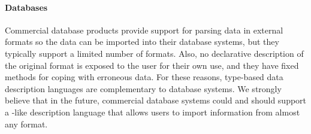 


\paragraph*{Databases}
Commercial database products provide support for
parsing data in external formats so the data can be imported into
their database systems, but they typically support a limited number of
formats.  Also, no declarative description of the
original format is exposed to the user for their own use, and they
have fixed methods for coping with erroneous data.  For these reasons,
type-based data description languages are complementary to database systems.  We strongly believe that
in the future, commercial database systems could and should support a 
\pads{}-like description language that allows users to import information from
almost any format.

